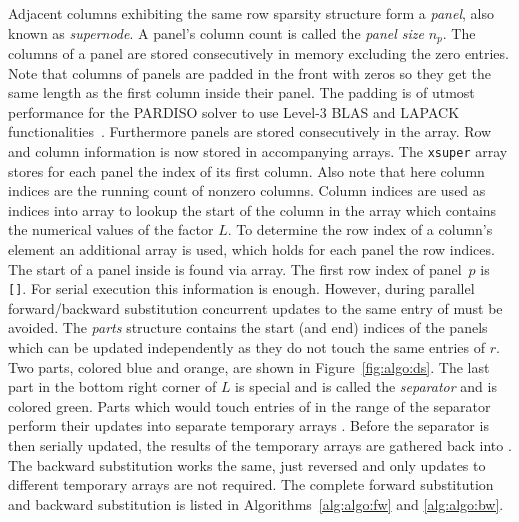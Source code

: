 Adjacent columns exhibiting the same row sparsity structure form a \textit{panel}, also known
as \textit{supernode}.
A panel's column count is called the \textit{panel size} $n_p$.
The columns of a panel are stored consecutively in memory excluding the zero
entries. 
Note that columns of panels are padded in the front with zeros so they get the 
same length as the first column inside their panel. The padding is of utmost performance
for the PARDISO solver to use Level-3 BLAS and LAPACK functionalities~\cite{20.500.11850/144477}.
 Furthermore panels are stored consecutively in the \vlnz{} array. 
Row and column information is now stored in accompanying arrays.
The \texttt{xsuper} array stores for each panel the index of its first column. 
Also note that here column indices are the running count of nonzero columns.
Column indices are used as indices into \vxlnz{} array to lookup the start of
the column in the \vlnz{} array which contains the numerical values of the factor $L$.
To determine the row index of a column's element an additional array \vindx{} is
used, which holds for each panel the row indices.
The start of a panel inside \vindx{} is found via \vxindx{} array.
The first row index of panel~$p$ is \vindx\texttt{[\vxindx[p]]}.
For serial execution this information is enough. 
However, during parallel forward/backward substitution concurrent updates to
the same entry of \vr{} must be avoided.
The \textit{parts} structure contains the start (and end) indices of the panels which can
be updated independently as they do not touch the same entries of $r$.
Two parts, colored blue and orange, are shown in Figure~\ref{fig:algo:ds}.
The last part in the bottom right corner of $L$ is special and is called the 
\textit{separator} and is colored green.
%
Parts which would touch entries of \vr{} in the range of the separator perform 
their updates into separate temporary arrays \vtemp{}.
Before the separator is then serially updated, the results of the temporary
arrays are gathered back into \vr{}. 
The backward substitution works the same, just reversed and
only updates to different temporary arrays are not required.
The complete forward substitution and backward substitution  is listed in Algorithms~\ref{alg:algo:fw} and \ref{alg:algo:bw}.
%


